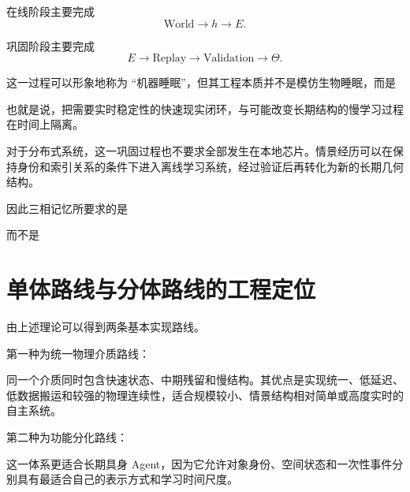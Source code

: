 在线阶段主要完成
\[
\mathrm{World}
\rightarrow
h
\rightarrow
E.
\]

巩固阶段主要完成
\[
E
\rightarrow
\mathrm{Replay}
\rightarrow
\mathrm{Validation}
\rightarrow
\Theta.
\]

这一过程可以形象地称为 ``机器睡眠''，但其工程本质并不是模仿生物睡眠，而是
\begin{statementbox}
\centering
{}
\end{statementbox}

也就是说，把需要实时稳定性的快速现实闭环，与可能改变长期结构的慢学习过程在时间上隔离。

对于分布式系统，这一巩固过程也不要求全部发生在本地芯片。情景经历可以在保持身份和索引关系的条件下进入离线学习系统，经过验证后再转化为新的长期几何结构。

因此三相记忆所要求的是
\begin{statementbox}
\centering
{}
\end{statementbox}
而不是
\begin{statementbox}
\centering
{}
\end{statementbox}

\section{单体路线与分体路线的工程定位}

由上述理论可以得到两条基本实现路线。

第一种为统一物理介质路线：
\begin{statementbox}
\centering
{}
\end{statementbox}

同一个介质同时包含快速状态、中期残留和慢结构。其优点是实现统一、低延迟、低数据搬运和较强的物理连续性，适合规模较小、情景结构相对简单或高度实时的自主系统。

第二种为功能分化路线：
\begin{statementbox}
\centering
{}
\end{statementbox}

这一体系更适合长期具身 Agent，因为它允许对象身份、空间状态和一次性事件分别具有最适合自己的表示方式和学习时间尺度。

